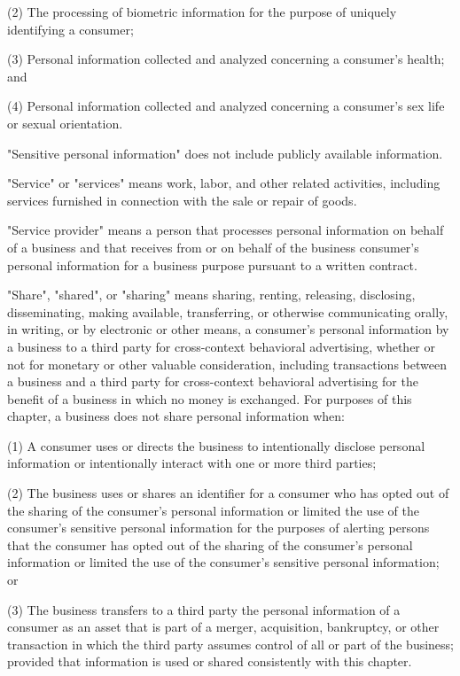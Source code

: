      (2)  The processing of biometric information for the purpose of uniquely identifying a consumer;

     (3)  Personal information collected and analyzed concerning a consumer's health; and

     (4)  Personal information collected and analyzed concerning a consumer's sex life or sexual orientation.

"Sensitive personal information" does not include publicly available information.

     "Service" or "services" means work, labor, and other related activities, including services furnished in connection with the sale or repair of goods.

     "Service provider" means a person that processes personal information on behalf of a business and that receives from or on behalf of the business consumer's personal information for a business purpose pursuant to a written contract.

     "Share", "shared", or "sharing" means sharing, renting, releasing, disclosing, disseminating, making available, transferring, or otherwise communicating orally, in writing, or by electronic or other means, a consumer's personal information by a business to a third party for cross-context behavioral advertising, whether or not for monetary or other valuable consideration, including transactions between a business and a third party for cross-context behavioral advertising for the benefit of a business in which no money is exchanged.  For purposes of this chapter, a business does not share personal information when:

     (1)  A consumer uses or directs the business to intentionally disclose personal information or intentionally interact with one or more third parties;

     (2)  The business uses or shares an identifier for a consumer who has opted out of the sharing of the consumer's personal information or limited the use of the consumer's sensitive personal information for the purposes of alerting persons that the consumer has opted out of the sharing of the consumer's personal information or limited the use of the consumer's sensitive personal information; or

     (3)  The business transfers to a third party the personal information of a consumer as an asset that is part of a merger, acquisition, bankruptcy, or other transaction in which the third party assumes control of all or part of the business; provided that information is used or shared consistently with this chapter.

